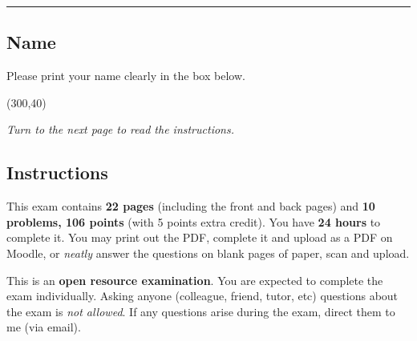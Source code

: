 \documentclass[12pt,twoside]{article}
\newcommand{\?}{\stackrel{?}{=}}
\newcommand{\class}{CEE 260/MIE 273: Probability \& Statistics in Civil Engineering}
\newcommand{\examnum}{E1: Midterm Exam}
\begin{document}
\title{\vspace{-5ex}{\sc \examnum}}
\author{\bf \class}
\date{October 16, 2024\\[4mm]
   {\sc time limit:} {\bf \sc Twenty-Four Hours}
}
%
\clearpage
\maketitle
\noindent\rule[1ex]{\textwidth}{.1pt}
\subsection*{Name}
Please print your name clearly in the box below.\\
\begin{center}
  \framebox(300,40){\Huge\phantom{t}} \\
  \vspace{2ex}
\end{center}

\vspace{40ex}
{\it Turn to the next page to read the instructions.}
\thispagestyle{empty}


\eject
\subsection*{Instructions}
This exam contains\textbf{ 22 pages} (including the front and back pages) and \textbf{10 problems, 106 points} (with 5 points extra credit). You have {\bf 24 hours} to complete it.  You may print out the PDF, complete it and upload as a
PDF on Moodle, or \textit{neatly} answer the questions on blank pages of paper, scan and upload.

\noindent This is an \textbf{open resource examination}. You are expected to complete the exam individually. Asking
anyone (colleague, friend, tutor, etc) questions about the exam is \textit{not allowed}. If any questions arise during the exam, direct them to me (via email).
\\
 
\end{document}
